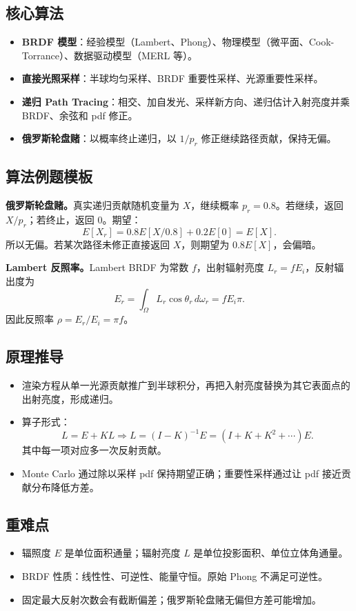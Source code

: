 \documentclass[UTF8,zihao=-4,scheme=chinese,fontset=fandol]{ctexart}
\newcommand{\key}[1]{\textbf{#1}}
\begin{document}
\subsection{核心算法}
\begin{itemize}
  \item \key{BRDF 模型}：经验模型（Lambert、Phong）、物理模型（微平面、Cook-Torrance）、数据驱动模型（MERL 等）。
  \item \key{直接光照采样}：半球均匀采样、BRDF 重要性采样、光源重要性采样。
  \item \key{递归 Path Tracing}：相交、加自发光、采样新方向、递归估计入射亮度并乘 BRDF、余弦和 pdf 修正。
  \item \key{俄罗斯轮盘赌}：以概率终止递归，以 $1/p_r$ 修正继续路径贡献，保持无偏。
\end{itemize}

\subsection{算法例题模板}
\textbf{俄罗斯轮盘赌。}真实递归贡献随机变量为 $X$，继续概率 $p_r=0.8$。若继续，返回 $X/p_r$；若终止，返回 $0$。期望：
\[
E[X_r]=0.8E[X/0.8]+0.2E[0]=E[X].
\]
所以无偏。若某次路径未修正直接返回 $X$，则期望为 $0.8E[X]$，会偏暗。

\textbf{Lambert 反照率。}Lambert BRDF 为常数 $f$，出射辐射亮度 $L_r=fE_i$，反射辐出度为
\[
E_r=\int_\Omega L_r\cos\theta_r\,d\omega_r=fE_i\pi.
\]
因此反照率 $\rho=E_r/E_i=\pi f$。

\subsection{原理推导}
\begin{itemize}
  \item 渲染方程从单一光源贡献推广到半球积分，再把入射亮度替换为其它表面点的出射亮度，形成递归。
  \item 算子形式：
  \[
  L=E+KL\Rightarrow L=(I-K)^{-1}E=(I+K+K^2+\cdots)E.
  \]
  其中每一项对应多一次反射贡献。
  \item Monte Carlo 通过除以采样 pdf 保持期望正确；重要性采样通过让 pdf 接近贡献分布降低方差。
\end{itemize}

\subsection{重难点}
\begin{itemize}
  \item 辐照度 $E$ 是单位面积通量；辐射亮度 $L$ 是单位投影面积、单位立体角通量。
  \item BRDF 性质：线性性、可逆性、能量守恒。原始 Phong 不满足可逆性。
  \item 固定最大反射次数会有截断偏差；俄罗斯轮盘赌无偏但方差可能增加。
\end{itemize}
\end{document}
